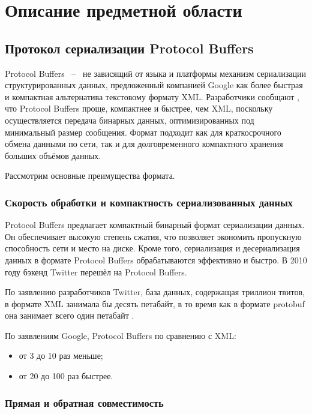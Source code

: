 \section{Описание предметной области}

\subsection{Протокол сериализации Protocol Buffers}

Protocol Buffers ~--~ не зависящий от языка и платформы механизм сериализации структурированных данных, предложенный компанией Google 
как более быстрая и компактная альтернатива текстовому формату XML. Разработчики сообщают \cite{protobuf_doc}, что Protocol Buffers проще, 
компактнее и быстрее, чем XML, поскольку осуществляется передача бинарных данных, оптимизированных под минимальный размер сообщения. 
Формат подходит как для краткосрочного обмена данными по сети, так и для долговременного компактного хранения больших объёмов данных.

Рассмотрим основные преимущества формата.

\subsubsection{Скорость обработки и компактность сериализованных данных}

Protocol Buffers предлагает компактный бинарный формат сериализации данных.
Он обеспечивает высокую степень сжатия, что позволяет экономить пропускную способность сети и место на диске. 
Кроме того, сериализация и десериализация данных в формате Protocol Buffers обрабатываются эффективно и быстро.
В 2010 году бэкенд Twitter перешёл на Protocol Buffers.

По заявлению разработчиков Twitter, база данных, содержащая триллион твитов, в формате XML занимала бы десять петабайт, в то время как в формате protobuf она занимает всего один петабайт \cite{protobuf_twitter}.

По заявлениям Google, Protocol Buffers по сравнению с XML:
\begin{itemize}
    \item от 3 до 10 раз меньше;
    \item от 20 до 100 раз быстрее.
\end{itemize}

\subsubsection{Прямая и обратная совместимость}


